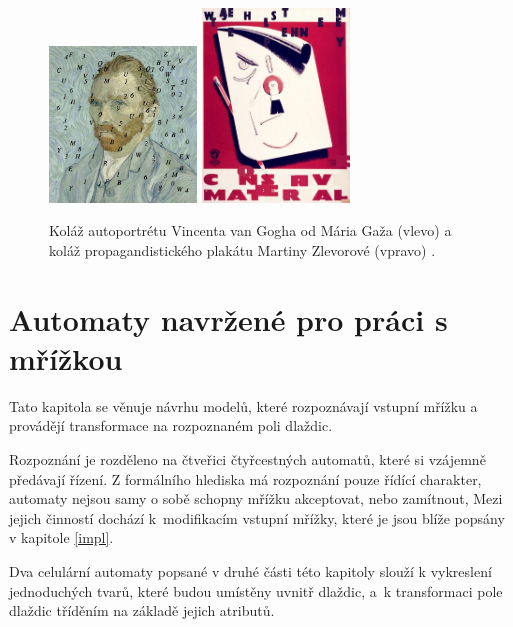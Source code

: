 \begin{figure}[H]
    \centering
    \includegraphics[width=0.35\textwidth]{obrazky-figures/GazoKolaz.jpg}
    \hspace{0.1\textwidth}
    \includegraphics[width=0.35\textwidth]{obrazky-figures/ZlevorovaKolaz.jpg}
    \caption{Koláž autoportrétu Vincenta van Gogha od Mária Gaža (vlevo) \cite{GazoBak} a koláž propagandistického plakátu Martiny Zlevorové (vpravo) \cite{ZlevorovaBak}.}
    \label{fig:CAKolaze}
\end{figure}

\chapter{Automaty navržené pro práci s mřížkou} 
\label{newAutomata}

Tato kapitola se věnuje návrhu modelů, které rozpoznávají vstupní mřížku a provádějí transformace na rozpoznaném poli dlaždic. 

Rozpoznání je rozděleno na čtveřici čtyřcestných automatů, které si vzájemně předávají řízení. Z formálního hlediska má rozpoznání pouze řídící charakter, automaty nejsou samy o sobě schopny mřížku akceptovat, nebo zamítnout, Mezi jejich činností dochází k~modifikacím vstupní mřížky, které je jsou blíže popsány v kapitole \ref{impl}.

Dva celulární automaty popsané v druhé části této kapitoly slouží k vykreslení jednoduchých tvarů, které budou umístěny uvnitř dlaždic, a~k transformaci pole dlaždic tříděním na základě jejich atributů.


